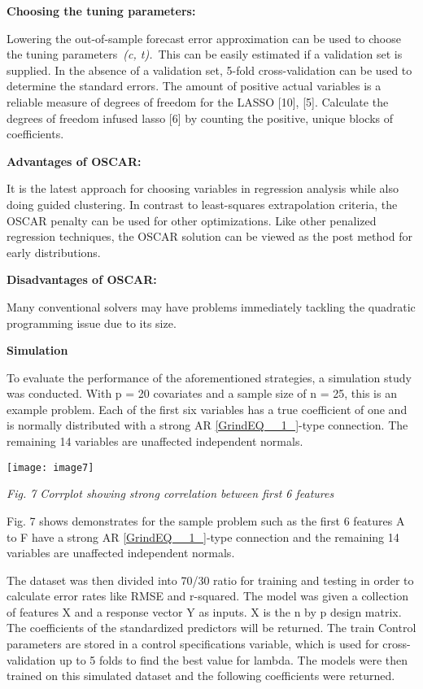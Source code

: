 \documentclass{article} %
\begin{document}
\noindent \textbf{Choosing the tuning parameters:}

\noindent Lowering the out-of-sample forecast error approximation can be used to choose the tuning parameters~\textit{(c, t).}~This can be easily estimated if a validation set is supplied. In the absence of a validation set, 5-fold cross-validation can be used to determine the standard errors. The amount of positive actual variables is a reliable measure of degrees of freedom for the LASSO [10], [5]. Calculate the degrees of freedom infused lasso [6] by counting the positive, unique blocks of coefficients.

\noindent 

\noindent \textbf{Advantages of OSCAR:}

\noindent It is the latest approach for choosing variables in regression analysis while also doing guided clustering. In contrast to least-squares extrapolation criteria, the OSCAR penalty can be used for other optimizations. Like other penalized regression techniques, the OSCAR solution can be viewed as the post method for early distributions.

\noindent 

\noindent \textbf{Disadvantages of OSCAR:}

\noindent Many conventional solvers may have problems immediately tackling the quadratic programming issue due to its size.

\noindent \textbf{}

\noindent \textbf{Simulation}

\noindent To evaluate the performance of the aforementioned strategies, a simulation study was conducted. With p = 20 covariates and a sample size of n = 25, this is an example problem. Each of the first six variables has a true coefficient of one and is normally distributed with a strong AR \eqref{GrindEQ__1_}-type connection. The remaining 14 variables are unaffected independent normals.

\noindent \texttt{[image: image7]}

\noindent \textit{Fig. 7 Corrplot showing strong correlation between first 6 features}

\noindent Fig. 7 shows demonstrates for the sample problem such as the first 6 features A to F have a strong AR \eqref{GrindEQ__1_}-type connection and the remaining 14 variables are unaffected independent normals.

\noindent 

\noindent The dataset was then divided into 70/30 ratio for training and testing in order to calculate error rates like RMSE and r-squared. The model was given a collection of features X and a response vector Y as inputs. X is the n by p design matrix. The coefficients of the standardized predictors will be returned. The train Control parameters are stored in a control specifications variable, which is used for cross-validation up to 5 folds to find the best value for lambda. The models were then trained on this simulated dataset and the following coefficients were returned.
\end{document}
